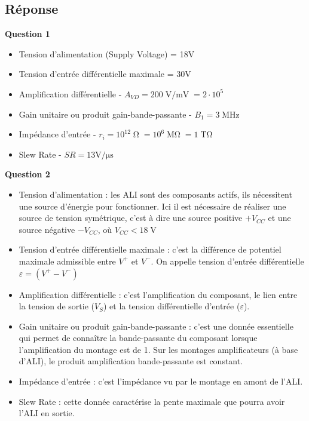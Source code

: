 \subsection*{Réponse}

\textbf{Question 1}

\begin{itemize}
	\item Tension d'alimentation (Supply Voltage) = 18V
	\item Tension d'entrée différentielle maximale = 30V
	\item Amplification différentielle - $A_{VD} = 200\operatorname{V/mV} = 2 \cdot 10^5$
	\item Gain unitaire ou produit gain-bande-passante - $B_1 = 3\operatorname{MHz}$ 
	\item Impédance d'entrée - $r_i = 10^{12}\operatorname{\Omega} = 10^6\operatorname{M\Omega} = 1\operatorname{T\Omega}$
	\item Slew Rate - $SR = 13\operatorname{V/\mu{}s}$
\end{itemize}

\textbf{Question 2}

\begin{itemize}
	\item Tension d'alimentation : les ALI sont des composants actifs, ils nécessitent une source d'énergie pour fonctionner. Ici il est nécessaire de réaliser une source de tension symétrique, c'est à dire une source positive $+V_{CC}$ et une source négative $-V_{CC}$, où $V_{CC} < 18\operatorname{V}$
	\item Tension d'entrée différentielle maximale : c'est la différence de potentiel maximale admissible entre $V^+$ et $V^-$. On appelle tension d'entrée différentielle $\varepsilon = (V^+ - V^-)$
	\item Amplification différentielle : c'est l'amplification du composant, le lien entre la tension de sortie ($V_S$) et la tension différentielle d'entrée ($\varepsilon$).
	\item Gain unitaire ou produit gain-bande-passante : c'est une donnée essentielle qui permet de connaître la bande-passante du composant lorsque l'amplification du montage est de 1. Sur les montages amplificateurs (à base d'ALI), le produit amplification bande-passante est constant. 
	\item Impédance d'entrée : c'est l'impédance vu par le montage en amont de l'ALI.
	\item Slew Rate : cette donnée caractérise la pente maximale que pourra avoir l'ALI en sortie.
\end{itemize}

